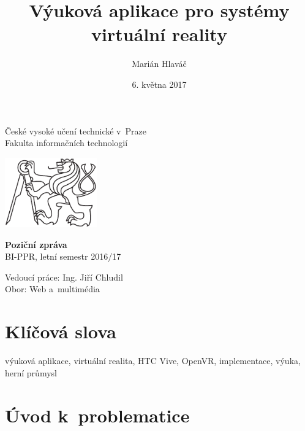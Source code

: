\documentclass[12pt, a4paper]{article}
\title{Výuková aplikace pro systémy virtuální reality}
\author{Marián Hlaváč}
\date{6. května 2017}
\begin{document}
    \begin{titlepage}

        \begin{center}
        České vysoké učení technické v~Praze\\
        Fakulta informačních technologií
        \end{center}

        \vspace{1cm}

        \begin{center}
        \includegraphics[height=3cm]{cvut-logo-bw}
        \end{center}

        \vspace{3cm}
        {\let\newpage\relax\maketitle}
        \thispagestyle{empty}

        \begin{center}
        \textbf{Poziční zpráva}\\
        BI-PPR, letní semestr 2016/17\\
        \end{center}

        \begin{center}
        Vedoucí práce: Ing. Jiří Chludil\\
        Obor: Web a~multimédia\\
        \end{center}
    \end{titlepage}

\section{Klíčová slova}

výuková aplikace, virtuální realita, HTC Vive, OpenVR, implementace, výuka, herní průmysl

\section{Úvod k~problematice}
\end{document}
